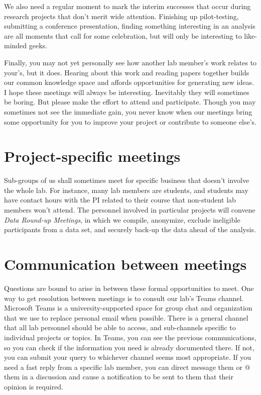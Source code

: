 \documentclass[
  12pt,
]{book}
\begin{document}
We also need a regular moment to mark the interim successes that occur during research projects that don't merit wide attention. Finishing up pilot-testing, submitting a conference presentation, finding something interesting in an analysis are all moments that call for some celebration, but will only be interesting to like-minded geeks.

Finally, you may not yet personally see how another lab member's work relates to your's, but it does. Hearing about this work and reading papers together builds our common knowledge space and affords opportunities for generating new ideas. I hope these meetings will always be interesting. Inevitably they will sometimes be boring. But please make the effort to attend and participate. Though you may sometimes not see the immediate gain, you never know when our meetings bring some opportunity for you to improve your project or contribute to someone else's.

\section{Project-specific meetings}\label{project-specific-meetings}

Sub-groups of us shall sometimes meet for specific business that doesn't involve the whole lab. For instance, many lab members are students, and students may have contact hours with the PI related to their course that non-student lab members won't attend. The personnel involved in particular projects will convene \emph{Data Round-up Meetings}, in which we compile, anonymize, exclude ineligible participants from a data set, and securely back-up the data ahead of the analysis.

\section{Communication between meetings}\label{communication-between-meetings}

Questions are bound to arise in between these formal opportunities to meet. One way to get resolution between meetings is to consult our lab's Teams channel. Microsoft Teams is a university-supported space for group chat and organization that we use to replace personal email when possible. There is a general channel that all lab personnel should be able to access, and sub-channels specific to individual projects or topics. In Teams, you can see the previous communications, so you can check if the information you need is already documented there. If not, you can submit your query to whichever channel seems most appropriate. If you need a fast reply from a specific lab member, you can direct message them or @ them in a discussion and cause a notification to be sent to them that their opinion is required.
\end{document}
